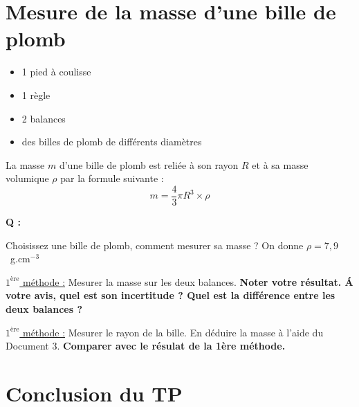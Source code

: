 \section{Mesure de la masse d'une bille de plomb}

\begin{mdframed}[style=autreexo]
\textbf{}
\begin{itemize}
    \item 1 pied à coulisse
    \item 1 règle
    \item 2 balances
    \item des billes de plomb de différents diamètres
\end{itemize}
\end{mdframed}

\begin{tcolorbox}[colback=blue!5!white,colframe=white!75!black,title=Document 3 :]La masse $m$ d'une bille de plomb est reliée à son rayon $R$ et à sa masse volumique $\rho$ par la formule suivante :
\begin{equation*}
    m = \frac{4}{3}\pi R^3\times\rho
\end{equation*}
\end{tcolorbox}

\begin{Large}{\textbf{Q :}} \end{Large} Choisissez une bille de plomb, comment mesurer sa masse ? On donne $\rho=7,9$~g.cm$^{-3}$
\newline
\newline

\underline{$1^{\text{ère}}$ méthode :} Mesurer la masse sur les deux balances. \textbf{Noter votre résultat. \'{A} votre avis, quel est son incertitude ? Quel est la différence entre les deux balances ?}
\vspace{5cm}

\underline{$1^{\text{ère}}$ méthode :} Mesurer le rayon de la bille. En déduire la masse à l'aide du Document 3. \textbf{Comparer avec le résulat de la 1ère méthode.}


\newpage

\section*{Conclusion du TP}

